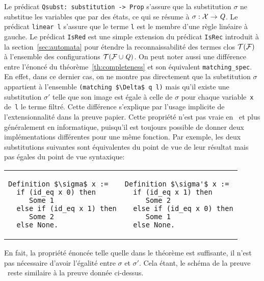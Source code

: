 Le prédicat \lstinline!Qsubst: substitution -> Prop! s'assure que la substitution 
$\sigma$ ne substitue les variables que par des états, ce qui se résume à $\sigma: \mathcal X \rightarrow \mathit Q$.
Le prédicat \lstinline!linear l! s'assure que le terme \lstinline!l! est le membre d'une règle linéaire à gauche.
Le prédicat \lstinline!IsRed! est une simple extension du prédicat \lstinline!IsRec!
introduit à la section~\ref{sec:automata} pour étendre la reconnaissabilité des termes clos
$\mathcal{T(F)}$ à l'ensemble des configurations $\mathcal{ T(F \cup \mathit Q)}$. 
On peut noter aussi une différence entre l'énoncé du théorème~\ref{th:completeness} et
son équivalent \lstinline!matching_spec!. En effet, dans ce dernier cas, on ne montre pas directement que la substitution 
$\sigma$ appartient à l'ensemble \lstinline!(matching $\Delta$ q l)! mais qu'il existe une substitution $\sigma'$
telle que son image est égale à celle de $\sigma$ pour chaque variable~\lstinline!x! de~\lstinline!l! le terme filtré.
Cette différence s'explique par l'usage implicite de l'extensionnalité dans la preuve papier. Cette propriété n'est pas vraie
en \coq\ et plus généralement en informatique, puisqu'il est toujours possible de donner deux implémentations
différentes pour une même fonction. Par exemple, les deux substitutions suivantes sont équivalentes 
du point de vue de leur résultat mais pas égales du point de vue syntaxique:
\begin{center}
  \begin{tabular}{l|l}
    \begin{minipage}{.45\linewidth}
\begin{lstlisting}
Definition $\sigma$ x :=
  if (id_eq x 0) then
     Some 1
  else if (id_eq x 1) then
     Some 2
  else None.
\end{lstlisting}
    \end{minipage}&
    \hspace{1.5cm}
    \begin{minipage}{.3\linewidth}
\begin{lstlisting}
Definition $\sigma'$ x :=
  if (id_eq x 1) then
     Some 2
  else if (id_eq x 0) then
     Some 1
  else None.
\end{lstlisting}   
    \end{minipage}
  \end{tabular}
\end{center}

En fait, la propriété énoncée telle quelle dans le théorème est suffisante, il n'est pas nécessaire
d'avoir l'égalité entre $\sigma$ et $\sigma'$. Cela étant, le schéma de la preuve \coq\ reste similaire 
à la preuve donnée ci-dessus.

